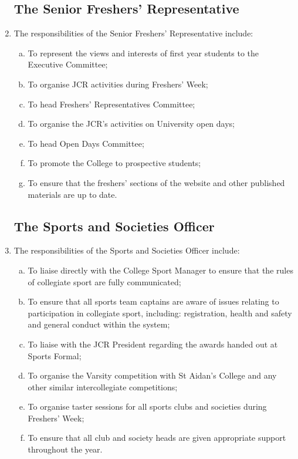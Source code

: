 \documentclass[12pt]{article}  %
\begin{document}
\begin{enumerate}
	\subsection{The Senior Freshers’ Representative}
	\item The responsibilities of the Senior Freshers' Representative include:
	\begin{enumerate}[(a)]
		\item To represent the views and interests of first year students to the Executive Committee;
		\item To organise JCR activities during Freshers’ Week;
		\item To head Freshers’ Representatives Committee;
		\item To organise the JCR’s activities on University open days;
		\item To head Open Days Committee;
		\item To promote the College to prospective students;
		\item To ensure that the freshers’ sections of the website and other published materials are up to date.
	\end{enumerate}
	\subsection{The Sports and Societies Officer}
	\item The responsibilities of the Sports and Societies Officer include:
	\begin{enumerate}[(a)]
		\item To liaise directly with the College Sport Manager to ensure that the rules of collegiate sport are fully communicated;
		\item To ensure that all sports team captains are aware of issues relating to participation in collegiate sport, including: registration, health and safety and general conduct within the system;
		\item To liaise with the JCR President regarding the awards handed out at Sports Formal;
		\item To organise the Varsity competition with St Aidan’s College and any other similar intercollegiate competitions;
		\item To organise taster sessions for all sports clubs and societies during Freshers’ Week;
		\item To ensure that all club and society heads are given appropriate support throughout the year.
	\end{enumerate}

\end{enumerate}
\end{document}
